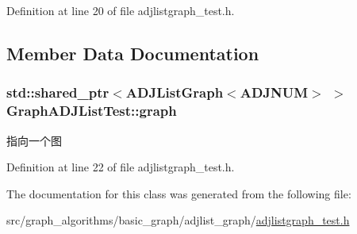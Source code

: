 Definition at line 20 of file adjlistgraph\+\_\+test.\+h.



\subsection{Member Data Documentation}
\hypertarget{class_graph_a_d_j_list_test_a2c21124ba286c96f94f6f0b036d5644e}{}
\subsubsection[{graph}]{\setlength{\rightskip}{0pt plus 5cm}std\+::shared\+\_\+ptr$<${\bf A\+D\+J\+List\+Graph}$<${\bf A\+D\+J\+N\+U\+M}$>$ $>$ Graph\+A\+D\+J\+List\+Test\+::graph\hspace{0.3cm}{\ttfamily [protected]}}\label{class_graph_a_d_j_list_test_a2c21124ba286c96f94f6f0b036d5644e}
指向一个图 

Definition at line 22 of file adjlistgraph\+\_\+test.\+h.



The documentation for this class was generated from the following file\+:\begin{DoxyCompactItemize}
\item 
src/graph\+\_\+algorithms/basic\+\_\+graph/adjlist\+\_\+graph/\hyperlink{adjlistgraph__test_8h}{adjlistgraph\+\_\+test.\+h}\end{DoxyCompactItemize}
